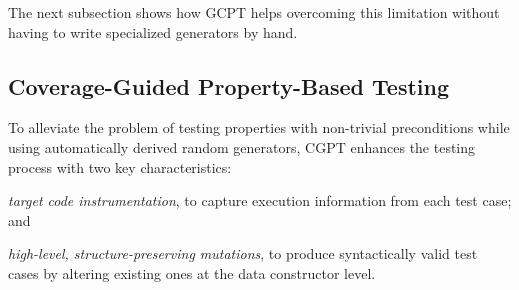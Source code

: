 \documentclass[sigconf, anonymous, review]{acmart}
\newcommand{\fuzzchick}{\textit{FuzzChick}\xspace}
\begin{document}
The next subsection shows how GCPT helps overcoming this limitation without
having to write specialized generators by hand.




\subsection{Coverage-Guided Property-Based Testing}

To alleviate the problem of testing properties with non-trivial preconditions
while using automatically derived random generators, CGPT
%
%
enhances the testing process with two key characteristics:
%
\begin{inparaenum}
\item \emph{target code instrumentation}, to capture execution information from
  each test case; and
\item \emph{high-level, structure-preserving mutations}, to produce
  syntactically valid test cases by altering existing ones at the data
  constructor level.
\end{inparaenum}
\end{document}
